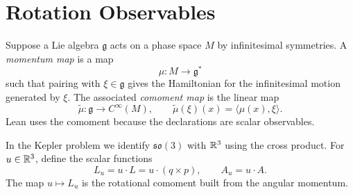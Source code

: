 \section{Rotation Observables}

\begin{definition}\label{def:rotation-observables}
Suppose a Lie algebra $\mathfrak g$ acts on a phase space $M$ by infinitesimal symmetries.
A \emph{momentum map} is a map
\[
  \mu \colon M \longrightarrow \mathfrak g^*
\]
such that pairing with $\xi \in \mathfrak g$ gives the Hamiltonian for the infinitesimal motion generated by $\xi$.
The associated \emph{comoment map} is the linear map
\[
  \tilde\mu \colon \mathfrak g \longrightarrow C^\infty(M),
  \qquad
  \tilde\mu(\xi)(x) = \langle \mu(x), \xi \rangle.
\]
Lean uses the comoment because the declarations are scalar observables.

In the Kepler problem we identify $\mathfrak{so}(3)$ with $\mathbb{R}^3$ using the cross product.
For $u \in \mathbb{R}^3$, define the scalar functions
\[
  L_u = u \cdot L = u \cdot (q \times p),
  \qquad
  A_u = u \cdot A.
\]
The map $u \mapsto L_u$ is the rotational comoment built from the angular momentum.
\leanok
\end{definition}

